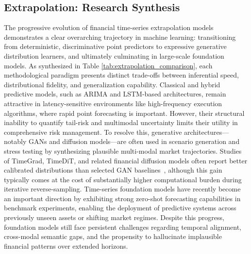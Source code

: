 \subsection{Extrapolation: Research Synthesis}
The progressive evolution of financial time-series extrapolation models demonstrates a clear overarching trajectory in machine learning: transitioning from deterministic, discriminative point predictors to expressive generative distribution learners, and ultimately culminating in large-scale foundation models. As synthesized in Table \ref{tab:extrapolation_comparison}, each methodological paradigm presents distinct trade-offs between inferential speed, distributional fidelity, and generalization capability. Classical and hybrid predictive models, such as ARIMA and LSTM-based architectures, remain attractive in latency-sensitive environments like high-frequency execution algorithms, where rapid point forecasting is important. However, their structural inability to quantify tail-risk and multimodal uncertainty limits their utility in comprehensive risk management. To resolve this, generative architectures—notably GANs and diffusion models—are often used in scenario generation and stress testing by synthesizing plausible multi-modal market trajectories. Studies of TimeGrad, TimeDiT, and related financial diffusion models often report better calibrated distributions than selected GAN baselines~\citep{rasul2021timegrad,cao2024timedit,tanaka2025cofindiff}, although this gain typically comes at the cost of substantially higher computational burden during iterative reverse-sampling. Time-series foundation models have recently become an important direction by exhibiting strong zero-shot forecasting capabilities in benchmark experiments, enabling the deployment of predictive systems across previously unseen assets or shifting market regimes. Despite this progress, foundation models still face persistent challenges regarding temporal alignment, cross-modal semantic gaps, and the propensity to hallucinate implausible financial patterns over extended horizons.

